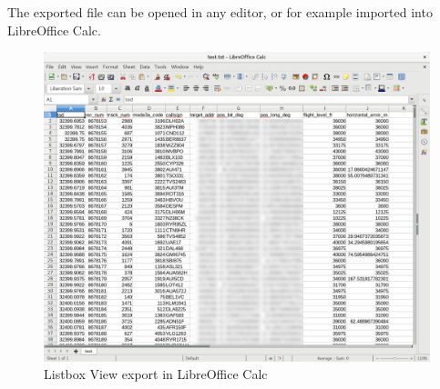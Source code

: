 The exported file can be opened in any editor, or for example imported into LibreOffice Calc.

\begin{figure}[H]
    \hspace*{-2cm}
    \includegraphics[width=18cm,frame]{../screenshots/listbox_exported_calc.png}
  \caption{Listbox View export in LibreOffice Calc}
  \label{fig:listbox_export_calc}
\end{figure}
 
